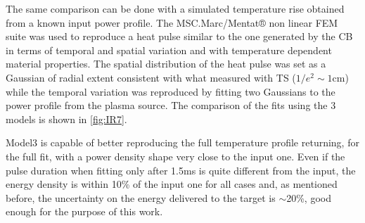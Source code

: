 The same comparison can be done with a simulated temperature rise obtained from a known input power profile. The MSC.Marc/Mentat® non linear FEM suite was used to reproduce a heat pulse similar to the one generated by the CB in terms of temporal and spatial variation and with temperature dependent material properties. The spatial distribution of the heat pulse was set as a Gaussian of radial extent consistent with what measured with TS ($1/e^2 \sim 1$cm) while the temporal variation was reproduced by fitting two Gaussians to the power profile from the plasma source. The comparison of the fits using the 3 models is shown in \autoref{fig:IR7}.

Model3 is capable of better reproducing the full temperature profile returning, for the full fit, with a power density shape very close to the input one. Even if the pulse duration when fitting only after 1.5ms is quite different from the input, the energy density is within 10\% of the input one for all cases and, as mentioned before, the uncertainty on the energy delivered to the target is $\sim$20\%, good enough for the purpose of this work.

